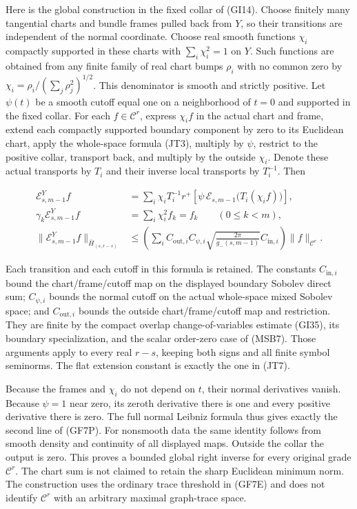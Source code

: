 \documentclass[
  11pt,
]{article}
\begin{document}
Here is the global construction in the fixed collar of (GI14). Choose
finitely many tangential charts and bundle frames pulled back from
\(Y\), so their transitions are independent of the normal coordinate.
Choose real smooth functions \(\chi_i\) compactly supported in these
charts with \(\sum_i\chi_i^2=1\) on \(Y\). Such functions are obtained
from any finite family of real chart bumps \(\rho_i\) with no common
zero by \(\chi_i=\rho_i/(\sum_j\rho_j^2)^{1/2}\). This denominator is
smooth and strictly positive. Let \(\psi(t)\) be a smooth cutoff equal
one on a neighborhood of \(t=0\) and supported in the fixed collar. For
each \(f\in\mathcal C^r\), express \(\chi_i f\) in the actual chart and
frame, extend each compactly supported boundary component by zero to its
Euclidean chart, apply the whole-space formula (JT3), multiply by
\(\psi\), restrict to the positive collar, transport back, and multiply
by the outside \(\chi_i\). Denote these actual transports by \(T_i\) and
their inverse local transports by \(T_i^{-1}\). Then

\[
 \begin{aligned}
 \mathcal E_{s,m-1}^{Y}f
 &=\sum_i\chi_i T_i^{-1}r^+
       \left[\psi\,\mathcal E_{s,m-1}
                   \bigl(T_i(\chi_i f)\bigr)\right],\\
 \gamma_k\mathcal E_{s,m-1}^{Y}f
 &=\sum_i\chi_i^2 f_k=f_k\qquad(0\leq k<m),\\
 \|\mathcal E_{s,m-1}^{Y}f\|_{\bar H_{(s,r-s)}}
 &\leq\left(\sum_i C_{\mathrm{out},i}C_{\psi,i}
              \sqrt{\frac{2\pi}{g_-(s,m-1)}}
                  C_{\mathrm{in},i}\right)\|f\|_{\mathcal C^r}.
 \end{aligned}
 \tag{GF7P}
\]

Each transition and each cutoff in this formula is retained. The
constants \(C_{\mathrm{in},i}\) bound the chart/frame/cutoff map on the
displayed boundary Sobolev direct sum; \(C_{\psi,i}\) bounds the normal
cutoff on the actual whole-space mixed Sobolev space; and
\(C_{\mathrm{out},i}\) bounds the outside chart/frame/cutoff map and
restriction. They are finite by the compact overlap change-of-variables
estimate (GI35), its boundary specialization, and the scalar order-zero
case of (MSB7). Those arguments apply to every real \(r-s\), keeping
both signs and all finite symbol seminorms. The flat extension constant
is exactly the one in (JT7).

Because the frames and \(\chi_i\) do not depend on \(t\), their normal
derivatives vanish. Because \(\psi=1\) near zero, its zeroth derivative
there is one and every positive derivative there is zero. The full
normal Leibniz formula thus gives exactly the second line of (GF7P). For
nonsmooth data the same identity follows from smooth density and
continuity of all displayed maps. Outside the collar the output is zero.
This proves a bounded global right inverse for every original grade
\(\mathcal C^r\). The chart sum is not claimed to retain the sharp
Euclidean minimum norm. The construction uses the ordinary trace
threshold in (GF7E) and does not identify \(\mathcal C^r\) with an
arbitrary maximal graph-trace space.
\end{document}
